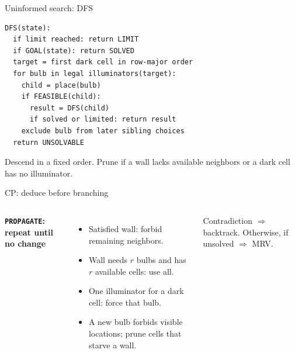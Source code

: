 \begin{frame}[fragile]{Uninformed search: DFS}
\begin{lstlisting}[breaklines=true]
DFS(state):
  if limit reached: return LIMIT
  if GOAL(state): return SOLVED
  target = first dark cell in row-major order
  for bulb in legal illuminators(target):
    child = place(bulb)
    if FEASIBLE(child):
      result = DFS(child)
      if solved or limited: return result
    exclude bulb from later sibling choices
  return UNSOLVABLE
\end{lstlisting}
\small Descend in a fixed order. Prune if a wall lacks available neighbors or a dark cell has no illuminator.
\end{frame}

\begin{frame}{CP: deduce before branching}
\begin{columns}[c,onlytextwidth]
\centering
{}\par{}
\small
\textbf{\texttt{PROPAGATE}: repeat until no change}
\begin{itemize}
\item Satisfied wall: forbid remaining neighbors.
\item Wall needs $r$ bulbs and has $r$ available cells: use all.
\item One illuminator for a dark cell: force that bulb.
\item A new bulb forbids visible locations; prune cells that starve a wall.
\end{itemize}
\vspace{2mm}Contradiction $\Rightarrow$ backtrack. Otherwise, if unsolved $\Rightarrow$ MRV.
\end{columns}
\end{frame}

